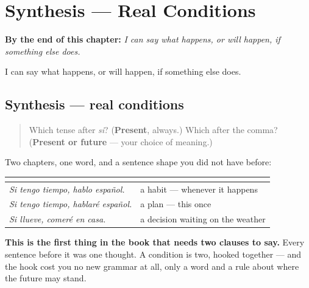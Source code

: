 
\chapter{Synthesis --- Real Conditions}
\label{ch:sintesis-condicion}

\begin{chapteropening}
\textbf{By the end of this chapter:} \emph{I can say what happens, or will happen, if something else does.}

I can say what happens, or will happen, if something else does.
\end{chapteropening}

\section[Practice]{Synthesis — real conditions}

\label{lesson:ES-C55-sintesis-condicion}



\begin{quote}
Which tense after \emph{si}? (\textbf{Present}, always.) Which after the comma? (\textbf{Present or future} — your choice of meaning.)
\end{quote}

\begin{grammarlens}[title={What you've built}]
Two chapters, one word, and a sentence shape you did not have before:

\noindent
\begin{tabularx}{\linewidth}{@{}>{\raggedright\arraybackslash}X>{\raggedright\arraybackslash}X@{}}
\toprule
\textbf{} & \textbf{} \\
\midrule
\emph{Si tengo tiempo, hablo español.} & a habit — whenever it happens \\
\emph{Si tengo tiempo, hablaré español.} & a plan — this once \\
\emph{Si llueve, comeré en casa.} & a decision waiting on the weather \\
\bottomrule
\end{tabularx}

\textbf{This is the first thing in the book that needs two clauses to say.} Every sentence before it was one thought. A condition is two, hooked together — and the hook cost you no new grammar at all, only a word and a rule about where the future may stand.
\end{grammarlens}

